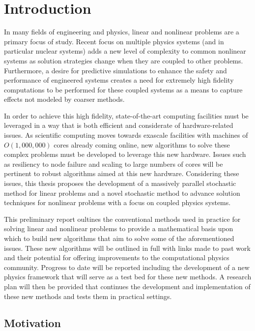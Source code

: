 \chapter{Introduction}
\label{ch:introduction}

In many fields of engineering and physics, linear and nonlinear
problems are a primary focus of study. Recent focus on multiple
physics systems (and in particular nuclear systems) adds a new level
of complexity to common nonlinear systems as solution strategies
change when they are coupled to other problems. Furthermore, a desire
for predictive simulations to enhance the safety and performance of
engineered systems creates a need for extremely high fidelity
computations to be performed for these coupled systems as a means to
capture effects not modeled by coarser methods.

In order to achieve this high fidelity, state-of-the-art computing
facilities must be leveraged in a way that is both efficient and
considerate of hardware-related issues. As scientific computing moves
towards exascale facilities with machines of $O(1,000,000)$ cores
already coming online, new algorithms to solve these complex problems
must be developed to leverage this new hardware. Issues such as
resiliency to node failure and scaling to large numbers of cores will
be pertinent to robust algorithms aimed at this new
hardware. Considering these issues, this thesis proposes the
development of a massively parallel stochastic method for linear
problems and a novel stochastic method to advance solution techniques
for nonlinear problems with a focus on coupled physics systems.

This preliminary report oultines the conventional methods used in
practice for solving linear and nonlinear problems to provide a
mathematical basis upon which to build new algorithms that aim to
solve some of the aforementioned issues. These new algorithms will be
outlined in full with links made to past work and their potential for
offering improvements to the computational physics community. Progress
to date will be reported including the development of a new physics
framework that will serve as a test bed for these new methods. A
research plan will then be provided that continues the development and
implementation of these new methods and tests them in practical
settings.

\section{Motivation}
\label{sec:motivation}

